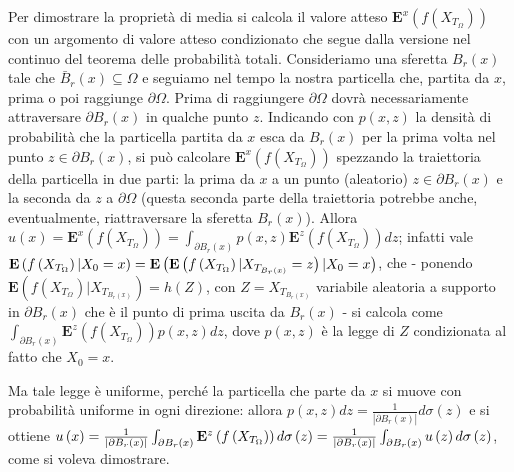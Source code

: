 \documentclass{article}
\begin{document}
Per dimostrare la propriet\`{a} di media si calcola il valore atteso $%
\mathbf{E}^{x}\left( f\left( X_{T_{\Omega }}\right) \right) $ con un
argomento di valore atteso condizionato che segue dalla versione nel
continuo del teorema delle probabilit\`{a} totali. Consideriamo una sferetta 
$B_{r}\left( x\right) $ tale che $\bar{B}_{r}\left( x\right) \subseteq
\Omega $ e seguiamo nel tempo la nostra particella che, partita da $x$,
prima o poi raggiunge $\partial \Omega $. Prima di raggiungere $\partial
\Omega $ dovr\`{a} necessariamente attraversare $\partial B_{r}\left(
x\right) $ in qualche punto $z$. Indicando con $p(x,z)$ la densit\`{a} di
probabilit\`{a} che la particella partita da $x$ esca da $B_{r}(x)$ per la
prima volta nel punto $z\in \partial B_{r}\left( x\right) $, si pu\`{o}
calcolare $\mathbf{E}^{x}\left( f\left( X_{T_{\Omega }}\right) \right) $
spezzando la traiettoria della particella in due parti: la prima da $x$ a un
punto (aleatorio) $z\in \partial B_{r}\left( x\right) $ e la seconda da $z$
a $\partial \Omega $ (questa seconda parte della traiettoria potrebbe anche,
eventualmente, riattraversare la sferetta $B_{r}\left( x\right) $). Allora $%
u\left( x\right) =\mathbf{E}^{x}\left( f\left( X_{T_{\Omega }}\right)
\right) =\int_{\partial B_{r}\left( x\right) }p\left( x,z\right) \mathbf{E}%
^{z}\left( f\left( X_{T_{\Omega }}\right) \right) dz$; infatti vale $\mathbf{%
E}\left( f\left( X_{T_{\Omega }}\right) |X_{0}=x\right) =\mathbf{E}\left( 
\mathbf{E}\left( f\left( X_{T_{\Omega }}\right) |X_{T_{B_{r}\left( x\right)
}}=z\right) |X_{0}=x\right) $, che - ponendo $\mathbf{E}\left( f\left(
X_{T_{\Omega }}\right) |X_{T_{B_{r}\left( x\right) }}\right) =h\left(
Z\right) $, con $Z=X_{T_{B_{r}\left( x\right) }}$ variabile aleatoria a
supporto in $\partial B_{r}\left( x\right) $ che \`{e} il punto di prima
uscita da $B_{r}\left( x\right) $ - si calcola come $\int_{\partial
B_{r}\left( x\right) }\mathbf{E}^{z}\left( f\left( X_{T_{\Omega }}\right)
\right) p\left( x,z\right) dz$, dove $p\left( x,z\right) $ \`{e} la legge di 
$Z$ condizionata al fatto che $X_{0}=x$.

Ma tale legge \`{e} uniforme, perch\'{e} la particella che parte da $x$ si
muove con probabilit\`{a} uniforme in ogni direzione: allora $p\left(
x,z\right) dz=\frac{1}{\left\vert \partial B_{r}\left( x\right) \right\vert }%
d\sigma \left( z\right) $ e si ottiene $u\left( x\right) =\frac{1}{%
\left\vert \partial B_{r}\left( x\right) \right\vert }\int_{\partial
B_{r}\left( x\right) }\mathbf{E}^{z}\left( f\left( X_{T_{\Omega }}\right)
\right) d\sigma \left( z\right) =\frac{1}{\left\vert \partial B_{r}\left(
x\right) \right\vert }\int_{\partial B_{r}\left( x\right) }u\left( z\right)
d\sigma \left( z\right) $, come si voleva dimostrare.
\end{document}
